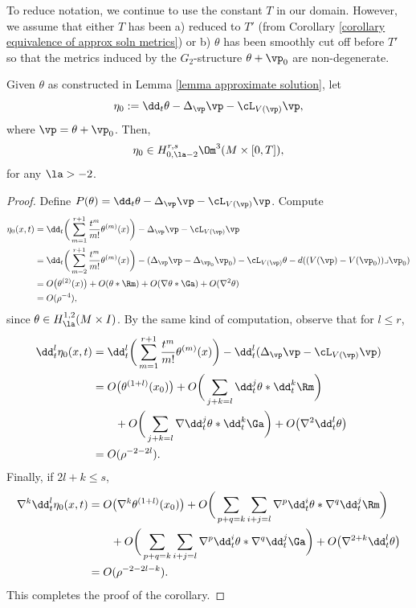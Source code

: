 \documentclass[hidelinks, 12pt, oneside, reqno]{amsart}
\begin{document}
\begin{rmk}
    To reduce notation, we continue to use the constant $T$ in our domain. However, we assume that either $T$ has been a) reduced to $T'$ (from Corollary \ref{corollary equivalence of approx soln metrics}) or b) $\theta$ has been smoothly cut off before $T'$ so that the metrics induced by the $G_2$-structure $\theta + \vp_0$ are non-degenerate.
\end{rmk}

\begin{cor}\label{corollary asymptotics of eta}
    Given $\theta$ as constructed in Lemma \ref{lemma approximate solution}, let 
    \[
    \eta_0 := \dd_t \theta - \Delta_{\vp} \vp - \cL_{V(\vp)}\vp,
    \]
    where $\vp = \theta + \vp_0$. Then, 
    \[
    \eta_0 \in H^{r,s}_{0,\la-2}\Om^3(M \times [0,T]),
    \]
    for any $\la > -2$. 
\end{cor}

\begin{proof}Define $P(\theta) = \dd_t \theta - \Delta_{\vp} \vp - \cL_{V(\vp)}\vp$. Compute
    \begin{align*}
        \eta_0(x,t) &= \dd_t \bigg(\sum_{m=1}^{r+1} \frac{t^m}{m!}\theta^{(m)}(x)\bigg) - \Delta_{\vp} \vp - \cL_{V(\vp)}\vp \\
        &= \dd_t \bigg(\sum_{m=2}^{r+1} \frac{t^m}{m!}\theta^{(m)}(x)\bigg) - (\Delta_{\vp} \vp - \Delta_{\vp_0}\vp_0) - \cL_{V(\vp)}\theta - d((V(\vp) - V(\vp_0))\lrcorner \vp_0) \\
        &= O\big(\theta^{(2)}(x)\big)  + O(\theta * \Rm) + O(\nabla \theta * \Ga) + O(\nabla^2\theta) \\
        &= O(\rho^{-4}),
    \end{align*}
    since $\theta \in H^{1,2}_{\la}(M \times I)$. By the same kind of computation, observe that for $l \le r$,
    \begin{align*}
        \dd_t^l \eta_0 (x,t) &= \dd_t^l \bigg(\sum_{m=1}^{r+1} \frac{t^m}{m!}\theta^{(m)}(x)\bigg) - \dd_t^l(\Delta_{\vp} \vp - \cL_{V(\vp)}\vp )\\
        &= O\big(\theta^{(1+l)}(x_0)\big)  + O\bigg(\sum_{j+k=l} \dd_t^j \theta * \dd_t^k \Rm\bigg) \\
        &\qquad + O\bigg(\sum_{j+k=l} \nabla \dd_t^j \theta * \dd_t^k\Ga\bigg) + O\big(\nabla^2\dd_t^l\theta\big) \\
        &= O(\rho^{-2 - 2l}).
    \end{align*}
    Finally, if $2l + k \le s$, 
    \begin{align*}
        \nabla^k \dd_t^l \eta_0(x,t)
        &= O\big(\nabla^k \theta^{(1+l)}(x_0)\big) + O\bigg(\sum_{p+q =k}\sum_{i+j=l} \nabla^p \dd_t^i \theta * \nabla^q \dd_t^j \Rm\bigg) \\
        &\qquad + O\bigg(\sum_{p+q =k}\sum_{i+j=l} \nabla^p \dd_t^i \theta * \nabla^q \dd_t^j\Ga\bigg) + O\big(\nabla^{2+k}\dd_t^l\theta\big) \\
        &= O(\rho^{-2 - 2l-k}).
    \end{align*}
    This completes the proof of the corollary.
\end{proof}
\end{document}
